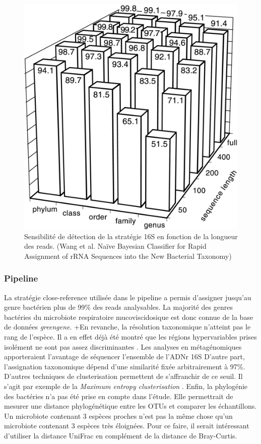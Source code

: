 \documentclass[12pt,a4paper]{article}
\begin{document}
\begin{figure}[t]
\begin{center}
\includegraphics[scale=3]{img/zam.jpg}\hfill
\end{center}
\caption{Sensibilité de détection de la stratégie 16S en fonction de la longueur des reads. (Wang et al. Naïve Bayesian Classifier for Rapid Assignment of rRNA Sequences into the New Bacterial Taxonomy) }
\label{rnasens}
\end{figure}

\subsubsection{Pipeline}
La stratégie close-reference utilisée dans le pipeline a permis d'assigner jusqu'au genre bactérien plus de 99\% des reads analysables. La majorité des genres bactéries du microbiote respiratoire mucoviscidosique est donc connue de la base de données \textit{greengene}.
 +En revanche, la résolution taxonomique n'atteint pas le rang de l'espèce. Il a en effet déjà été montré que les régions hypervariables prises isolément ne sont pas assez discriminantes \cite{Yang2016}. Les analyses en métagénomiques apporteraient l'avantage de séquencer l'ensemble de l'ADNr 16S \cite{Ranjan2016}
D'autre part, l'assignation taxonomique dépend d'une similarité fixée arbitrairement à 97\%. D'autres techniques de clusterisation permettent de s'affranchir de ce seuil. Il s'agit par exemple de la \textit{Maximum entropy clusterisation} \cite{Bobadilla2015}. 
Enfin, la phylogénie des bactéries n'a pas été prise en compte dans l'étude. Elle permettrait de mesurer une distance phylogénétique entre les OTUs et comparer les échantillons. Un microbiote contenant 3 espèces proches n'est pas la même chose qu'un microbiote contenant 3 espèces très éloignées. Pour ce faire, il serait intéressant d'utiliser la distance UniFrac\cite{Lozupone2005} en complément de la distance de Bray-Curtis. 
\end{document}
